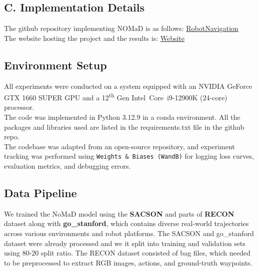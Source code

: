 \documentclass[12pt]{article}
\begin{document}
\subsection*{C. Implementation Details}
The github repository implementing NOMaD is as follows: \href{https://github.com/ishobhnik/RobotNavigation}{RobotNavigation}\\
The website hosting the project and the results is: \href{}{Website}
\subsection{Environment Setup}
All experiments were conducted on a system equipped with an NVIDIA GeForce GTX 1660 SUPER GPU and a 12\textsuperscript{th} Gen Intel\textregistered~Core\texttrademark~i9-12900K (24-core) processor. \\
The code was implemented in Python 3.12.9 in a conda environment. All the packages and libraries used are listed in the requirements.txt file in the github repo.\\
The codebase was adapted from an open-source repository\cite{gitnomad}, and experiment tracking was performed using \texttt{Weights \& Biases (WandB)} for logging loss curves, evaluation metrics, and debugging errors.
\subsection{Data Pipeline}
We trained the NoMaD model using the \textbf{SACSON} and parts of \textbf{RECON} dataset along with \textbf{go\_stanford}, which contains diverse real-world trajectories across various environments and robot platforms.
The SACSON and go\_stanford dataset were already processed and we it split into training and validation sets using 80-20 split ratio. The RECON dataset consisted of bag files, which needed to be preprocessed to extract RGB images, actions, and ground-truth waypoints.
\end{document}
